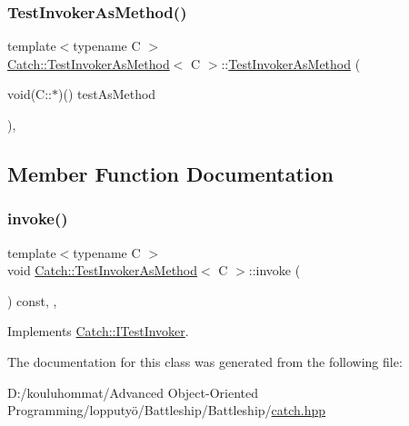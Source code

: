 \subsubsection{\texorpdfstring{Test\+Invoker\+As\+Method()}{TestInvokerAsMethod()}}
{\footnotesize\ttfamily template$<$typename C $>$ \\
\mbox{\hyperlink{class_catch_1_1_test_invoker_as_method}{Catch\+::\+Test\+Invoker\+As\+Method}}$<$ C $>$\+::\mbox{\hyperlink{class_catch_1_1_test_invoker_as_method}{Test\+Invoker\+As\+Method}} (\begin{DoxyParamCaption}\item[{void(C\+::$\ast$)()}]{test\+As\+Method }\end{DoxyParamCaption})\hspace{0.3cm}{\ttfamily [inline]}, {\ttfamily [noexcept]}}



\subsection{Member Function Documentation}
\mbox{\label{class_catch_1_1_test_invoker_as_method_a8115a06efe273f4112ec0b5452c1b5f2}} 
\subsubsection{\texorpdfstring{invoke()}{invoke()}}
{\footnotesize\ttfamily template$<$typename C $>$ \\
void \mbox{\hyperlink{class_catch_1_1_test_invoker_as_method}{Catch\+::\+Test\+Invoker\+As\+Method}}$<$ C $>$\+::invoke (\begin{DoxyParamCaption}{ }\end{DoxyParamCaption}) const\hspace{0.3cm}{\ttfamily [inline]}, {\ttfamily [override]}, {\ttfamily [virtual]}}



Implements \mbox{\hyperlink{struct_catch_1_1_i_test_invoker_a6fcd5c5b67d6d5ade6491ff33411ca7f}{Catch\+::\+I\+Test\+Invoker}}.



The documentation for this class was generated from the following file\+:\begin{DoxyCompactItemize}
\item 
D\+:/kouluhommat/\+Advanced Object-\/\+Oriented Programming/lopputyö/\+Battleship/\+Battleship/\mbox{\hyperlink{catch_8hpp}{catch.\+hpp}}\end{DoxyCompactItemize}
